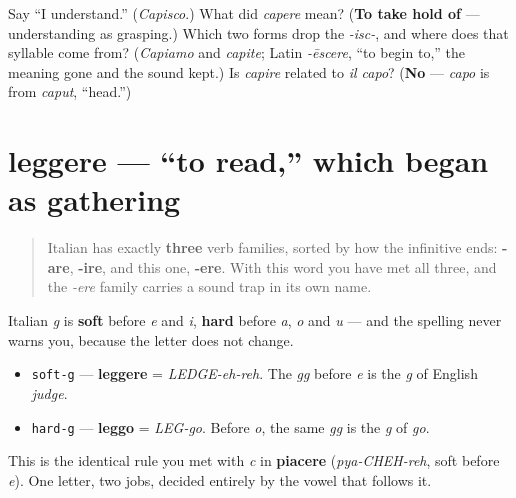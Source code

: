 \begin{tcolorbox}[breakable,colback=teal!4,colframe=teal!35!black,title={Before you move on}]
Say \textquotedblleft{}I understand.\textquotedblright{} (\emph{Capisco}.) What did \emph{capere} mean? (\textbf{To take hold of} — understanding as grasping.) Which two forms drop the \emph{-isc-}, and where does that syllable come from? (\emph{Capiamo} and \emph{capite}; Latin \emph{-ēscere}, \textquotedblleft{}to begin to,\textquotedblright{} the meaning gone and the sound kept.) Is \emph{capire} related to \emph{il capo}? (\textbf{No} — \emph{capo} is from \emph{caput}, \textquotedblleft{}head.\textquotedblright{})
\end{tcolorbox}
\section[leggere]{leggere — \textquotedblleft{}to read,\textquotedblright{} which began as gathering}

\label{lesson:IT-C18-leggere}



\begin{quote}
Italian has exactly \textbf{three} verb families, sorted by how the infinitive ends: \textbf{-are}, \textbf{-ire}, and this one, \textbf{-ere}. With this word you have met all three, and the \emph{-ere} family carries a sound trap in its own name.
\end{quote}

\begin{sounds}
Italian \emph{g} is \textbf{soft} before \emph{e} and \emph{i}, \textbf{hard} before \emph{a}, \emph{o} and \emph{u} — and the spelling never warns you, because the letter does not change.

\begin{itemize}
\raggedright
  \item \texttt{soft-g} — \textbf{leggere} = \emph{LEDGE-eh-reh}. The \emph{gg} before \emph{e} is the \emph{g} of English \emph{judge}.
  \item \texttt{hard-g} — \textbf{leggo} = \emph{LEG-go}. Before \emph{o}, the same \emph{gg} is the \emph{g} of \emph{go}.
\end{itemize}

This is the identical rule you met with \emph{c} in \textbf{piacere} (\emph{pya-CHEH-reh}, soft before \emph{e}). One letter, two jobs, decided entirely by the vowel that follows it.
\end{sounds}

